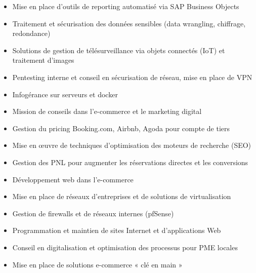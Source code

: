 \documentclass[10pt,a4paper,ragged2e,withhyper]{altacv}
\begin{document}
\begin{paracol}{2}
\begin{itemize}
\item Mise en place d'outils de reporting automatisé via SAP Business Objects
\item Traitement et sécurisation des données sensibles (data wrangling, chiffrage, redondance)
\item Solutions de gestion de télésurveillance via objets connectés (IoT) et traitement d'images
\item Pentesting interne et conseil en sécurisation de réseau, mise en place de VPN
\item Infogérance sur serveurs et docker
\end{itemize}

\divider

\begin{itemize}
\item Mission de conseils dans l'e-commerce et le marketing digital
\item Gestion du pricing Booking.com, Airbnb, Agoda pour compte de tiers
\item Mise en œuvre de techniques d'optimisation des moteurs de recherche (SEO)
\item Gestion des PNL pour augmenter les réservations directes et les conversions
\end{itemize}

\divider

\begin{itemize}
\item Développement web dans l'e-commerce
\item Mise en place de réseaux d'entreprises et de solutions de virtualisation
\item Gestion de firewalls et de réseaux internes (pfSense)
\end{itemize}

\divider

\begin{itemize}
\item Programmation et maintien de sites Internet et d'applications Web
\item Conseil en digitalisation et optimisation des processus pour PME locales
\item Mise en place de solutions e-commerce « clé en main »
\end{itemize}


\end{paracol}
\end{document}
